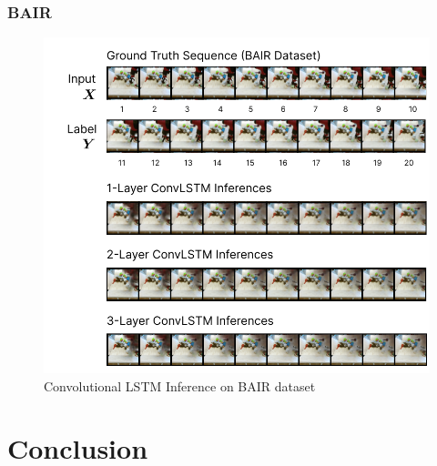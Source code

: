 \documentclass{scrartcl}
\begin{document}
\subsubsection{BAIR}
\label{subsubsec:bair}

\begin{figure}[H]
	\begin{center}
		\includegraphics[width=1\textwidth]{images/bair/bair_inferences.png}
	\end{center}
	\caption{Convolutional LSTM Inference on BAIR dataset}
	\label{img:lstm_bair_inference}
\end{figure}

\newpage
\section{Conclusion}
\label{sec:conclusion}


\newpage

\newpage
\end{document}

